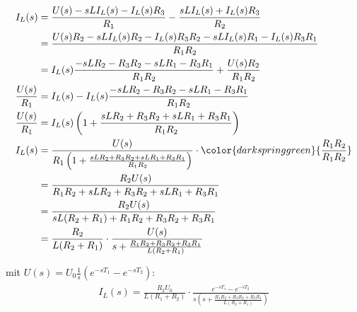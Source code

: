 \documentclass[11pt]{scrartcl}
\begin{document}
\begin{align}
  \begin{split}
    I_{L}(s) &= \frac{U(s) - s L I_{L}(s) - I_{L}(s) R_{3}}{R_{1}} - \frac{s L  I_{L}(s) + I_{L}(s)  R_{3}}{R_{2}} \\
    &= \frac{U(s) R_{2} - s L I_{L}(s) R_{2} - I_{L}(s) R_{3} R_{2} - s L  I_{L}(s)  R_{1} - I_{L}(s)  R_{3} R_{1}}{R_{1} R_{2}}\\
    &= I_{L}(s) \frac{-s L  R_{2} - R_{3} R_{2} - s L  R_{1} - R_{3} R_{1}}{R_{1} R_{2}} + \frac{U(s) R_{2}}{R_{1} R_{2}} \\
    \frac{U(s)}{R_{1}} &= I_{L}(s) - I_{L}(s)\frac{-s L  R_{2} - R_{3} R_{2} - s L  R_{1} - R_{3} R_{1}}{R_{1} R_{2}} \\
    \frac{U(s)}{R_{1}} &=  I_{L}(s) \left(1 + \frac{s L  R_{2} + R_{3} R_{2} + s L  R_{1} + R_{3} R_{1}}{R_{1} R_{2}}\right) \\
    I_{L}(s) &= \frac{U(s)}{R_{1} \left( 1 + \frac{s L  R_{2} + R_{3} R_{2} + s L  R_{1} + R_{3} R_{1}}{R_{1} R_{2}} \right)} \cdot {\color{darkspringgreen}{\frac{R_{1}R_{2}}{R_{1}R_{2}}}} \\
    &= \frac{R_{2}U(s)}{R_{1}R_{2} + s L  R_{2} + R_{3} R_{2} + s L  R_{1} + R_{3} R_{1}}\\
    &= \frac{R_{2}U(s)}{s L  (R_{2}+ R_{1}) + R_{1}R_{2} + R_{3}R_{2} + R_{3} R_{1}}\\
    &= \frac{R_{2}}{L(R_{2} + R_{1})} \cdot \frac{U(s)}{s + \frac{R_{1}R_{2} + R_{3}R_{2} + R_{3}R_{1}}{L(R_{2} + R_{1})}}
  \end{split}
\end{align}

mit $\displaystyle U(s) = U_{0} \frac{1}{s} \left(e^{-sT_{1}} - e^{-sT_{2}} \right)$:
\begin{align}\label{eq:IL}
  \begin{split}
    I_{L}(s) = \frac{R_{2}U_{0}}{L(R_{1} + R_{2})} \cdot \frac{e^{-sT_{1}} - e^{-sT_{2}}}{s\left( s + \frac{R_{1}R_{2} + R_{3}R_{2} + R_{3}R_{1}}{L(R_{2} + R_{1})}\right)}
  \end{split}
\end{align}
\end{document}
